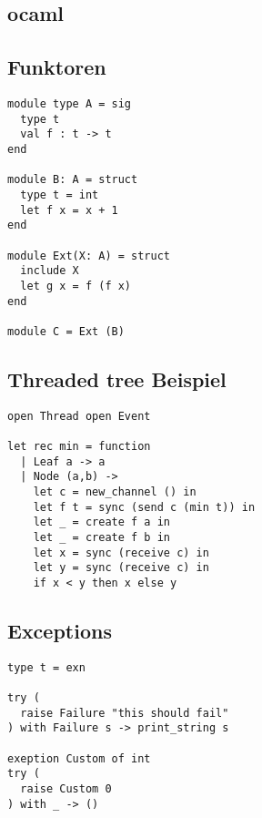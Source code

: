 \documentclass[a4paper,8pt,landscape]{extarticle}
\begin{document}
\begin{multicols*}{3}
    
    \section{ocaml}
    \subsection{Funktoren}
    \begin{verbatim}
module type A = sig
  type t
  val f : t -> t
end

module B: A = struct
  type t = int
  let f x = x + 1
end

module Ext(X: A) = struct
  include X
  let g x = f (f x)
end

module C = Ext (B)
    \end{verbatim}
    \subsection{Threaded tree Beispiel}
    \begin{verbatim}
open Thread open Event

let rec min = function
  | Leaf a -> a
  | Node (a,b) ->
    let c = new_channel () in
    let f t = sync (send c (min t)) in
    let _ = create f a in
    let _ = create f b in
    let x = sync (receive c) in
    let y = sync (receive c) in
    if x < y then x else y
    \end{verbatim}
    \subsection{Exceptions}
    \begin{verbatim}
type t = exn

try (
  raise Failure "this should fail"
) with Failure s -> print_string s

exeption Custom of int
try (
  raise Custom 0
) with _ -> ()
    \end{verbatim}

\end{multicols*}
\end{document}
